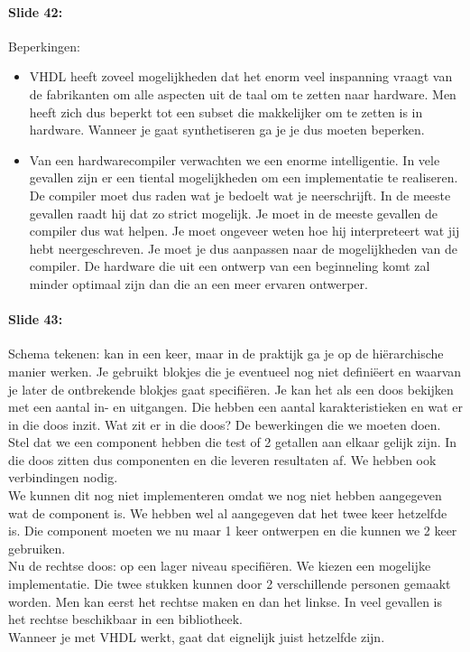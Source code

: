\documentclass[10pt,a4paper]{book}
\begin{document}
\paragraph{Slide 42:} Beperkingen:
\begin{itemize}
\item VHDL heeft zoveel mogelijkheden dat het enorm veel inspanning vraagt van de fabrikanten om alle aspecten uit de taal om te zetten naar hardware. Men heeft zich dus beperkt tot een subset die makkelijker om te zetten is in hardware. Wanneer je gaat synthetiseren ga je je dus moeten beperken.
\item Van een hardwarecompiler verwachten we een enorme intelligentie. In vele gevallen zijn er een tiental mogelijkheden om een implementatie te realiseren. De compiler moet dus raden wat je bedoelt wat je neerschrijft. In de meeste gevallen raadt hij dat zo strict mogelijk. Je moet in de meeste gevallen de compiler dus wat helpen. Je moet ongeveer weten hoe hij interpreteert wat jij hebt neergeschreven. Je moet je dus aanpassen naar de mogelijkheden van de compiler. De hardware die uit een ontwerp van een beginneling komt zal minder optimaal zijn dan die an een meer ervaren ontwerper.
\end{itemize}

\paragraph{Slide 43:} Schema tekenen: kan in een keer, maar in de praktijk ga je op de hi\"erarchische manier werken. Je gebruikt blokjes die je eventueel nog niet defini\"eert en waarvan je later de ontbrekende blokjes gaat specifi\"eren. Je kan het als een doos bekijken met een aantal in- en uitgangen. Die hebben een aantal karakteristieken en wat er in die doos inzit. Wat zit er in die doos? De bewerkingen die we moeten doen. Stel dat we een component hebben die test of 2 getallen aan elkaar gelijk zijn. In die doos zitten dus componenten en die leveren resultaten af. We hebben ook verbindingen nodig.\\
We kunnen dit nog niet implementeren omdat we nog niet hebben aangegeven wat de component is. We hebben wel al aangegeven dat het twee keer hetzelfde is. Die component moeten we nu maar 1 keer ontwerpen en die kunnen we 2 keer gebruiken.\\
Nu de rechtse doos: op een lager niveau specifi\"eren. We kiezen een mogelijke implementatie. Die twee stukken kunnen door 2 verschillende personen gemaakt worden. Men kan eerst het rechtse maken en dan het linkse. In veel gevallen is het rechtse beschikbaar in een bibliotheek.\\
Wanneer je met VHDL werkt, gaat dat eignelijk juist hetzelfde zijn.
\end{document}
